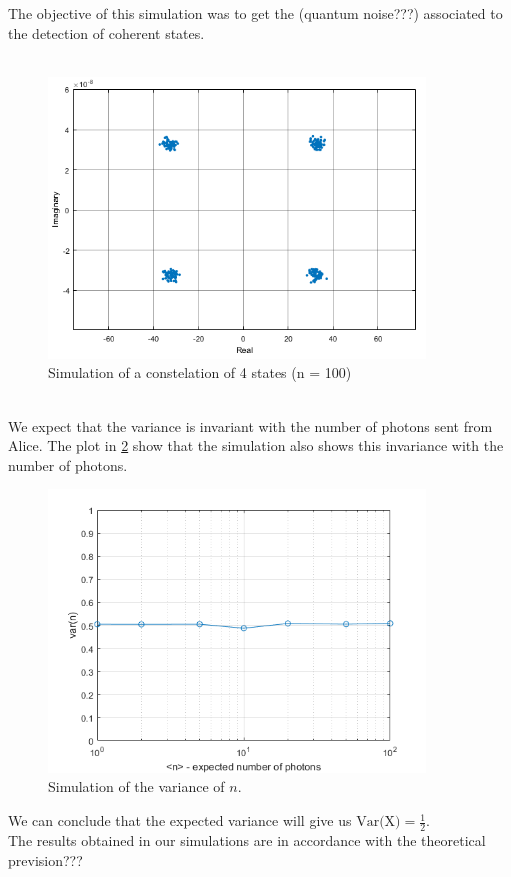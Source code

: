 The objective of this simulation was to get the (quantum noise???) associated to the detection of coherent states.\\
\\
\begin{figure}[h]
\centering
\includegraphics[width=10cm]{./sdf/quantum_noise/figures/constelation1.png}
\caption{Simulation of a constelation of 4 states (n = 100)}
\label{fig:constelation}
\end{figure}
\\
We expect that the variance is invariant with the number of photons sent from Alice. The plot in \ref{fig:variance} show that the simulation also shows this invariance with the number of photons.\\
\begin{figure}[H]
\centering
\includegraphics[width=10cm]{./sdf/quantum_noise/figures/variance_n.png}
\caption{Simulation of the variance of $n$.}
\label{fig:variance}
\end{figure}
We can conclude that the expected variance will give us $\textrm{Var(X)} = \frac{1}{2}$.\\
The results obtained in our simulations are in accordance with the theoretical prevision???


